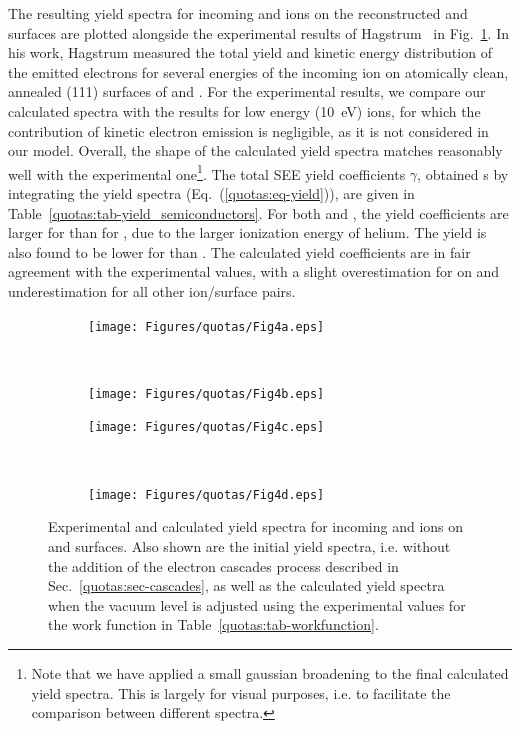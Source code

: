\begin{refsection}
The resulting yield spectra for incoming  and  ions on the 
reconstructed  and  surfaces are plotted alongside the 
experimental results of Hagstrum~\cite{Hagstrum1960} in 
Fig.~\ref{quotas:fig-results_semiconductors}. In his work, Hagstrum measured 
the total yield and kinetic energy distribution of the emitted electrons for 
several energies of the incoming ion on atomically clean, annealed (111) 
surfaces of  and . For the experimental results, we 
compare our calculated spectra with the results for low energy 
(10~\si{\electronvolt}) ions, for which the contribution of kinetic electron 
emission is negligible, as it is not considered in our model. 
Overall, the shape of the calculated yield spectra matches reasonably well 
with the experimental one\footnote{Note that we have applied a small gaussian 
broadening to the final calculated yield spectra. This is largely for visual purposes, i.e. to facilitate 
the comparison between different spectra.}. 
The total SEE yield coefficients $\gamma$, obtained s
by integrating the yield spectra (Eq.~(\ref{quotas:eq-yield})), are given in 
Table~\ref{quotas:tab-yield_semiconductors}. For both  and , the 
yield coefficients are larger for  than for , due to the 
larger ionization energy of helium. The yield is also found to 
be lower for  than . The calculated yield coefficients 
are in fair agreement with the experimental values, with a slight 
overestimation for  on  and underestimation for 
all other ion/surface pairs. 

\begin{figure}[ht] 
    \centering 
    \captionsetup{width=0.9\textwidth}
    \begin{subfigure}[t]{0.49\textwidth} 
        \centering 
        \texttt{[image: Figures/quotas/Fig4a.eps]} 
    \end{subfigure}%
    ~  
    \begin{subfigure}[t]{0.49\textwidth} 
        \centering 
        \texttt{[image: Figures/quotas/Fig4b.eps]} 
    \end{subfigure} 
    \begin{subfigure}[t]{0.49\textwidth} 
        \centering 
        \texttt{[image: Figures/quotas/Fig4c.eps]} 
    \end{subfigure}%
    ~  
    \begin{subfigure}[t]{0.49\textwidth} 
        \centering 
        \texttt{[image: Figures/quotas/Fig4d.eps]} 
    \end{subfigure} 
    \caption{\label{quotas:fig-results_semiconductors} Experimental and 
calculated yield spectra for incoming  and  ions on 
 and  surfaces. Also shown are the initial yield 
spectra, i.e. without the addition of the electron cascades process described 
in Sec.~\ref{quotas:sec-cascades}, as well as the calculated yield spectra 
when the vacuum level is adjusted using the experimental values for the work 
function in Table~\ref{quotas:tab-workfunction}.} 
\end{figure} 


\end{refsection}
